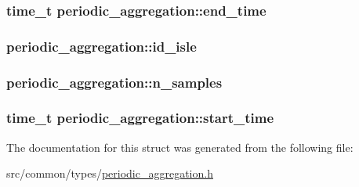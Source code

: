 \subsubsection[{\texorpdfstring{end\+\_\+time}{end_time}}]{\setlength{\rightskip}{0pt plus 5cm}time\+\_\+t periodic\+\_\+aggregation\+::end\+\_\+time}\hypertarget{structperiodic__aggregation_acb2fde54d57fd50bb87dce20920bd1eb}{}\label{structperiodic__aggregation_acb2fde54d57fd50bb87dce20920bd1eb}
\subsubsection[{\texorpdfstring{id\+\_\+isle}{id_isle}}]{ periodic\+\_\+aggregation\+::id\+\_\+isle}\hypertarget{structperiodic__aggregation_a03a3a3e84da52909ea2f545a4e735d4c}{}\label{structperiodic__aggregation_a03a3a3e84da52909ea2f545a4e735d4c}
\subsubsection[{\texorpdfstring{n\+\_\+samples}{n_samples}}]{ periodic\+\_\+aggregation\+::n\+\_\+samples}\hypertarget{structperiodic__aggregation_a2048b14063a67f92b18cdcf4ed10030d}{}\label{structperiodic__aggregation_a2048b14063a67f92b18cdcf4ed10030d}
\subsubsection[{\texorpdfstring{start\+\_\+time}{start_time}}]{\setlength{\rightskip}{0pt plus 5cm}time\+\_\+t periodic\+\_\+aggregation\+::start\+\_\+time}\hypertarget{structperiodic__aggregation_a4818076c7544f5a45368e33bcfc50d73}{}\label{structperiodic__aggregation_a4818076c7544f5a45368e33bcfc50d73}


The documentation for this struct was generated from the following file\+:\begin{DoxyCompactItemize}
\item 
src/common/types/\hyperlink{periodic__aggregation_8h}{periodic\+\_\+aggregation.\+h}\end{DoxyCompactItemize}
